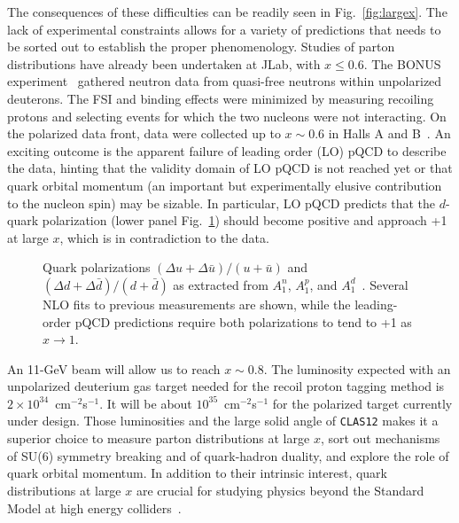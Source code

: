 The consequences of these difficulties can be readily seen in 
Fig.~\ref{fig:largex}.  The lack of experimental constraints allows for a 
variety of predictions that needs to be sorted out to establish the proper
phenomenology. Studies of parton distributions have already been undertaken 
at JLab, with $x \leq 0.6$. The BONUS experiment~\cite{BONUS} gathered 
neutron data from quasi-free neutrons within unpolarized deuterons.  The 
FSI and binding effects were minimized by measuring recoiling protons and 
selecting events for which the two nucleons were not interacting.  On the 
polarized data front, data were collected up to $x \sim 0.6$ in Halls A and 
B~\cite{Zheng:2004ce, Dharmawardane:2006zd}.  An exciting outcome is the 
apparent failure of leading order (LO) pQCD to describe the data, hinting 
that the validity domain of LO pQCD is not reached yet or that quark orbital 
momentum (an important but experimentally elusive contribution to the nucleon 
spin) may be sizable. In particular, LO pQCD predicts that the $d$-quark 
polarization (lower panel Fig.~\ref{fig:E99117}) should become positive and 
approach +1 at large $x$, which is in contradiction to the data.

\begin{figure}
\vspace{9.0cm}
\caption{\small{Quark polarizations $( \Delta u+ \Delta\bar{u})/(u+\bar{u})$ 
and $( \Delta d+ \Delta\bar{d})/(d+\bar{d})$ as extracted from $A_1^n$, 
$A_1^p$, and $A_1^d$~\cite{Zheng:2004ce, Dharmawardane:2006zd}.  Several NLO 
fits to previous measurements are shown, while the leading-order pQCD 
predictions require both polarizations to tend to +1 as $x \to 1$.}}
\label{fig:E99117}
\end{figure}

An 11-GeV beam will allow us to reach $x \sim 0.8$. The luminosity expected 
with an unpolarized deuterium gas target needed for the recoil proton tagging 
method is $2 \times 10^{34}$~cm$^{-2}$s$^{-1}$.  It will be about 
$10^{35}$~cm$^{-2}$s$^{-1}$ for the polarized target currently under design. 
Those luminosities and the large solid angle of {\tt CLAS12} makes it a 
superior choice to measure parton distributions at large $x$, sort out 
mechanisms of SU(6) symmetry breaking and of quark-hadron duality, and explore 
the role of quark orbital momentum.  In addition to their intrinsic interest, 
quark distributions at large $x$ are crucial for studying physics beyond the 
Standard Model at high energy colliders~\cite{Kuhlmann:1999sf}.
